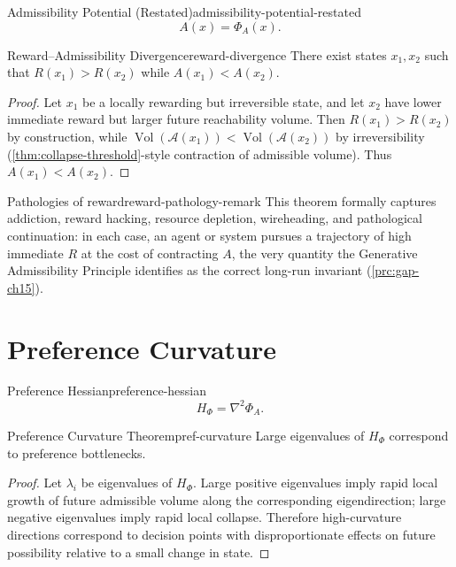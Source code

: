 \documentclass[12pt,twoside,openright]{book}
\newcommand{\adm}{\mathcal{A}}
\newcommand{\Vol}{\operatorname{Vol}}
\begin{document}
\begin{definition}{Admissibility Potential (Restated)}{admissibility-potential-restated}
  \[
    A(x) = \Phi_A(x).
  \]
\end{definition}

\begin{theorem}{Reward--Admissibility Divergence}{reward-divergence}
  There exist states $x_1, x_2$ such that
  $R(x_1) > R(x_2)$ while $A(x_1) < A(x_2)$.
\end{theorem}

\begin{proof}
  Let $x_1$ be a locally rewarding but irreversible state,
  and let $x_2$ have lower immediate reward but larger
  future reachability volume. Then $R(x_1) > R(x_2)$ by
  construction, while $\Vol(\adm(x_1)) < \Vol(\adm(x_2))$
  by irreversibility (\cref{thm:collapse-threshold}-style
  contraction of admissible volume). Thus $A(x_1) < A(x_2)$.
\end{proof}

\begin{remark}{Pathologies of reward}{reward-pathology-remark}
  This theorem formally captures addiction, reward hacking,
  resource depletion, wireheading, and pathological
  continuation: in each case, an agent or system pursues a
  trajectory of high immediate $R$ at the cost of
  contracting $A$, the very quantity the Generative
  Admissibility Principle identifies as the correct
  long-run invariant (\cref{prc:gap-ch15}).
\end{remark}

\section{Preference Curvature}
\label{sec:ch22-curvature}

\begin{definition}{Preference Hessian}{preference-hessian}
  \[
    H_\Phi = \nabla^2 \Phi_A.
  \]
\end{definition}

\begin{theorem}{Preference Curvature Theorem}{pref-curvature}
  Large eigenvalues of $H_\Phi$ correspond to preference
  bottlenecks.
\end{theorem}

\begin{proof}
  Let $\lambda_i$ be eigenvalues of $H_\Phi$. Large positive
  eigenvalues imply rapid local growth of future admissible
  volume along the corresponding eigendirection; large
  negative eigenvalues imply rapid local collapse.
  Therefore high-curvature directions correspond to decision
  points with disproportionate effects on future possibility
  relative to a small change in state.
\end{proof}
\end{document}
